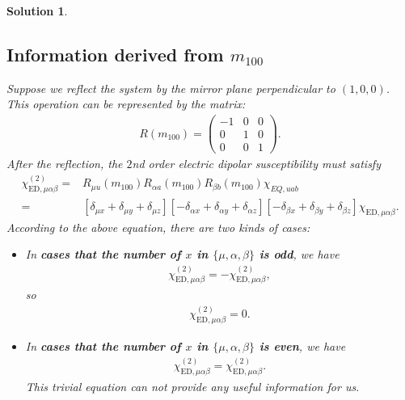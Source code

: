 \documentclass[UTF8,10pt,a4paper]{article}
\theoremstyle{Problem}
\theoremstyle{Solution}
\newtheorem*{sol}{Solution}
\begin{document}
\begin{sol}
    \subsection{Information derived from $m_{100}$}
    Suppose we reflect the system by the mirror plane perpendicular to $(1,0,0)$. This operation can be represented by the matrix:
    \begin{align}
        R(m_{100})=\left(\begin{matrix}
            -1&0&0\\
            0&1&0\\
            0&0&1
        \end{matrix}\right).
    \end{align}
    After the reflection, the $2$nd order electric dipolar susceptibility must satisfy
    \begin{align}
        \nonumber\chi_{\text{ED},\mu\alpha\beta}^{(2)}=&R_{\mu u}(m_{100})R_{\alpha a}(m_{100})R_{\beta b}(m_{100})\chi_{EQ,uab}\\
        =&[\delta_{\mu x}+\delta_{\mu y}+\delta_{\mu z}][-\delta_{\alpha x}+\delta_{\alpha y}+\delta_{\alpha z}][-\delta_{\beta x}+\delta_{\beta y}+\delta_{\beta z}]\chi_{\text{ED},\mu\alpha\beta}.
    \end{align}
    According to the above equation, there are two kinds of cases:
    \begin{itemize}
        \item In \textbf{cases that the number of $x$ in $\{\mu,\alpha,\beta\}$ is odd}, we have
        \begin{align}
            \chi_{\text{ED},\mu\alpha\beta}^{(2)}=-\chi_{\text{ED},\mu\alpha\beta}^{(2)},
        \end{align}
        so
        \begin{align}
            \chi_{\text{ED},\mu\alpha\beta}^{(2)}=0.
        \end{align}
        \item In \textbf{cases that the number of $x$ in $\{\mu,\alpha,\beta\}$ is even}, we have
        \begin{align}
            \chi_{\text{ED},\mu\alpha\beta}^{(2)}=\chi_{\text{ED},\mu\alpha\beta}^{(2)}.
        \end{align}
        This trivial equation can not provide any useful information for us.
    \end{itemize}

\end{sol}
\end{document}
